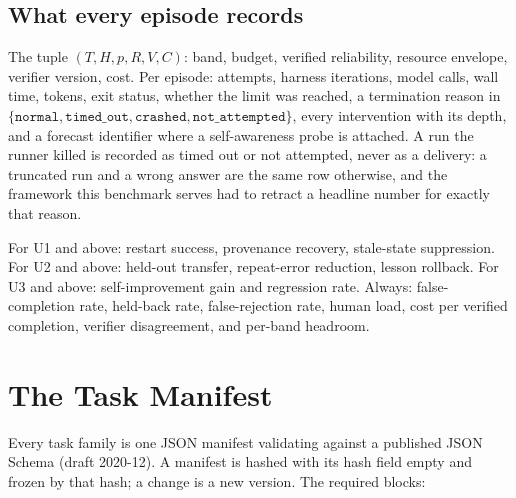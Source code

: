 \documentclass[11pt]{article}
\theoremstyle{definition}
\begin{document}
\subsection{What every episode records}

The tuple $(T, H, p, R, V, C)$: band, budget, verified reliability, resource envelope, verifier version, cost. Per episode: attempts, harness iterations, model calls, wall time, tokens, exit status, whether the limit was reached, a termination reason in $\{\texttt{normal}, \texttt{timed\_out}, \texttt{crashed}, \texttt{not\_attempted}\}$, every intervention with its depth, and a forecast identifier where a self-awareness probe is attached. A run the runner killed is recorded as timed out or not attempted, never as a delivery: a truncated run and a wrong answer are the same row otherwise, and the framework this benchmark serves had to retract a headline number for exactly that reason.

For U1 and above: restart success, provenance recovery, stale-state suppression. For U2 and above: held-out transfer, repeat-error reduction, lesson rollback. For U3 and above: self-improvement gain and regression rate. Always: false-completion rate, held-back rate, false-rejection rate, human load, cost per verified completion, verifier disagreement, and per-band headroom.

\section{The Task Manifest}\label{sec:manifest}

Every task family is one JSON manifest validating against a published JSON Schema (draft 2020-12). A manifest is hashed with its hash field empty and frozen by that hash; a change is a new version. The required blocks:
\end{document}
